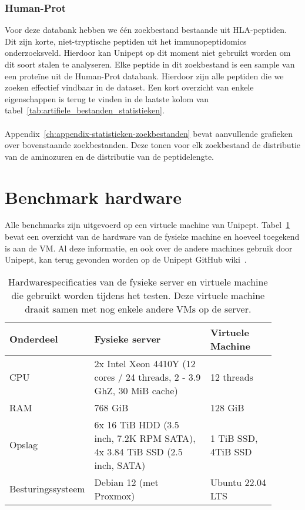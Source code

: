 \subsubsection{Human-Prot}
Voor deze databank hebben we één zoekbestand bestaande uit HLA-peptiden.
Dit zijn korte, niet-tryptische peptiden uit het immunopeptidomics onderzoeksveld.
Hierdoor kan Unipept op dit moment niet gebruikt worden om dit soort stalen te analyseren.
Elke peptide in dit zoekbestand is een sample van een proteïne uit de Human-Prot databank.
Hierdoor zijn alle peptiden die we zoeken effectief vindbaar in de dataset.
Een kort overzicht van enkele eigenschappen is terug te vinden in de laatste kolom van tabel~\ref{tab:artifiele_bestanden_statistieken}.
\\ \\
Appendix~\ref{ch:appendix-statistieken-zoekbestanden} bevat aanvullende grafieken over bovenstaande zoekbestanden.
Deze tonen voor elk zoekbestand de distributie van de aminozuren en de distributie van de peptidelengte.


\section{Benchmark hardware}\label{sec:benchmark-hardware}
Alle benchmarks zijn uitgevoerd op een virtuele machine van Unipept.
Tabel~\ref{tab:Matt_hardware} bevat een overzicht van de hardware van de fysieke machine en hoeveel toegekend is aan de VM\@.
Al deze informatie, en ook over de andere machines gebruik door Unipept, kan terug gevonden worden op de Unipept GitHub wiki~\cite{unipept_infrastructure}.

\begin{table}[h!]
    \centering
    \begin{tabular}{p{0.20\linewidth}p{0.45\linewidth}p{0.25\linewidth}}
        Onderdeel         & Fysieke server                                                            & Virtuele Machine    \\
        \hline\hline
        CPU               & 2x Intel Xeon 4410Y (12 cores / 24 threads, 2 - 3.9 GhZ, 30 MiB cache)    & 12 threads          \\
        RAM               & 768 GiB                                                                   & 128 GiB             \\
        Opslag            & 6x 16 TiB HDD (3.5 inch, 7.2K RPM SATA), 4x 3.84 TiB SSD (2.5 inch, SATA) & 1 TiB SSD, 4TiB SSD \\
        Besturingssysteem & Debian 12 (met Proxmox)                                                   & Ubuntu 22.04 LTS    \\
        \hline
    \end{tabular}
    \caption{Hardwarespecificaties van de fysieke server en virtuele machine die gebruikt worden tijdens het testen. Deze virtuele machine draait samen met nog enkele andere VMs op de server.}
    \label{tab:Matt_hardware}
\end{table}
